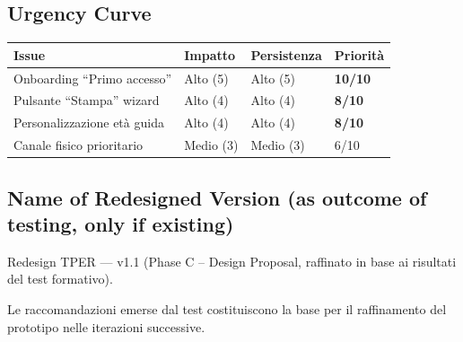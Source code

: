 \documentclass[11pt,a4paper]{article}
\begin{document}
\begin{tcolorbox}[colback=backgroundColor,colframe=primaryColor,arc=2mm]
\subsection*{Urgency Curve}

\begin{center}
\renewcommand{\arraystretch}{1.3}
\begin{tabular}{|L{3.5cm}|L{2.5cm}|L{2.5cm}|L{2.5cm}|}
\hline
{}
\textbf{Issue} & \textbf{Impatto} & \textbf{Persistenza} & \textbf{Priorit\`a} \\
\hline
Onboarding ``Primo accesso'' & Alto (5) & Alto (5) & \textbf{10/10} \\
\hline
Pulsante ``Stampa'' wizard & Alto (4) & Alto (4) & \textbf{8/10} \\
\hline
Personalizzazione et\`a guida & Alto (4) & Alto (4) & \textbf{8/10} \\
\hline
Canale fisico prioritario & Medio (3) & Medio (3) & 6/10 \\
\hline
\end{tabular}
\end{center}

\vspace{0.3cm}
\subsection*{Name of Redesigned Version (as outcome of testing, only if existing)}

\noindent Redesign TPER --- v1.1 (Phase C -- Design Proposal, raffinato in base ai risultati del test formativo).

\vspace{0.1cm}
\noindent Le raccomandazioni emerse dal test costituiscono la base per il raffinamento del prototipo nelle iterazioni successive.

\end{tcolorbox}
\end{document}
